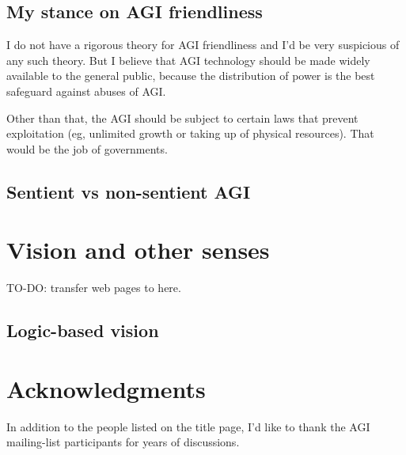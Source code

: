 \documentclass[a4paper]{report}
\begin{document}
\section{My stance on AGI friendliness}

I do not have a rigorous theory for AGI friendliness and I'd be very suspicious of any such theory.  But I believe that AGI technology should be made widely available to the general public, because the distribution of power is the best safeguard against abuses of AGI.

Other than that, the AGI should be subject to certain laws that prevent exploitation (eg, unlimited growth or taking up of physical resources).  That would be the job of governments.

\section{Sentient vs non-sentient AGI}


\chapter{Vision and other senses}
\label{ch:vision}
\minitoc

TO-DO:  transfer web pages to here.

\section{Logic-based vision}

% 

\chapter*{Acknowledgments}

In addition to the people listed on the title page, I'd like to thank the AGI mailing-list participants for years of discussions.
\end{document}

